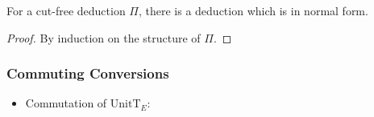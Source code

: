 \begin{theorem}[Normalization]
  For a cut-free deduction $\Pi$, there is a deduction which is in normal form.
\end{theorem}
\begin{proof}
  By induction on the structure of $\Pi$.
\end{proof}



\subsubsection{Commuting Conversions}

\begin{itemize}

\item Commutation of $\mathrm{UnitT}_E$:
  \begin{itemize}


\end{itemize}
\end{itemize}
